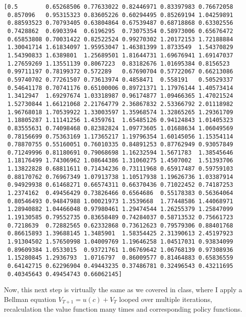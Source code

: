 \documentclass[11pt]{article}
\begin{document}
    \begin{Verbatim}[commandchars=\\\{\}]
[0.5        0.65268506 0.77633022 0.82446971 0.83397983 0.76672058
 0.857096   0.95315323 0.83605226 0.60294495 0.85269194 1.04259891
 0.88593523 0.70793405 0.63804864 0.67539487 0.68718868 0.63302556
 0.7428862  0.6903394  0.6196295  0.73075354 0.58973006 0.65676472
 0.65853808 0.70031422 0.82522524 0.99270302 1.20172153 1.72188884
 1.30041714 1.61834097 1.95953047 1.46381399 1.8733549  1.54370829
 1.54390833 1.6389801  1.25689501 1.81644731 1.69676941 1.69147037
 1.27659269 1.13551139 0.8067223  0.83182676 1.01695384 0.8156523
 0.99711197 0.78199372 0.572289   0.67690704 0.57722067 0.66213086
 0.59740702 0.77261507 0.73613974 0.4858471  0.558191   0.50529337
 0.54641178 0.70741176 0.65100006 0.89721371 1.17976144 1.40573414
 1.3412947  1.69297674 1.03318987 0.96174877 1.09466365 1.47021524
 1.52730844 1.66121068 2.21764779 2.36867832 2.53366792 2.01118982
 1.96768018 1.70539922 1.33003597 1.35968574 1.32865265 1.29361709
 1.18805287 1.11141256 1.4359761  1.65485126 0.94124843 1.01405323
 0.83555631 0.74098468 0.82382824 1.09773605 1.01688634 1.06049569
 0.78156699 0.75363169 1.17365217 1.19796354 1.60145056 1.15354114
 0.78870755 0.55160051 0.76010335 0.84891253 0.87762949 0.93057849
 0.71249996 0.81180691 0.79068698 1.16232594 1.5671783  1.38545646
 1.18176499 1.74306962 1.08644386 1.31060275 1.4507002  1.51393706
 1.13822828 0.68811611 0.71434236 0.73111968 0.65917487 0.59759103
 0.88170762 0.76967349 1.07913738 1.10517938 1.19626736 1.03387914
 0.94929938 0.61468271 0.66574311 0.66370436 0.71022452 0.74187253
 1.2374162  0.49456429 0.73826466 0.6564686  0.55178383 0.56364064
 0.80546493 0.94847988 1.00021973 1.3539668  1.77448586 1.44068971
 1.28940882 1.04466048 0.97980461 1.29474544 1.26255379 1.25847099
 1.19130585 0.79552735 0.83658489 0.74284037 0.58713532 0.75661723
 0.7218639  0.72882565 0.62332868 0.73612623 0.79579306 0.88401768
 0.86615893 1.39688145 1.3485901  1.58354425 2.31390613 2.45197923
 1.91304502 1.57650998 1.04009769 1.19646258 1.04517031 0.93834099
 0.89609384 1.0533015  0.93721761 1.06769642 1.06768139 0.97308936
 1.15280845 1.2936793  1.0716797  0.86009577 0.81464883 0.65836559
 0.64142715 0.62296904 0.49443235 0.37486781 0.32496543 0.43211695
 0.40345643 0.49454743 0.66062145]

    \end{Verbatim}

    Now, this next step is virtually the same as we covered in class, where
I apply a Bellman equation \(V_{T+1} = u(c) + V_{T}\) looped over
multiple iterations, recalculation the value function many times and
corresponding policy functions.
\end{document}
